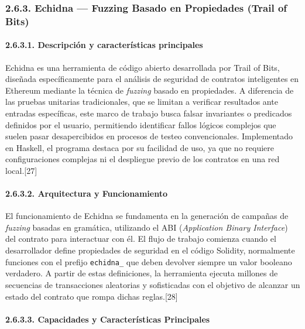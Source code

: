 \subsubsection{2.6.3. Echidna --- Fuzzing Basado en Propiedades (Trail
of Bits)}\label{echidna-fuzzing-basado-en-propiedades-trail-of-bits}

\paragraph{2.6.3.1. Descripción y características
principales}\label{descripciuxf3n-y-caracteruxedsticas-principales-2}

Echidna es una herramienta de código abierto desarrollada por Trail of
Bits, diseñada específicamente para el análisis de seguridad de
contratos inteligentes en Ethereum mediante la técnica de \emph{fuzzing}
basado en propiedades. A diferencia de las pruebas unitarias
tradicionales, que se limitan a verificar resultados ante entradas
específicas, este marco de trabajo busca falsar invariantes o predicados
definidos por el usuario, permitiendo identificar fallos lógicos
complejos que suelen pasar desapercibidos en procesos de testeo
convencionales. Implementado en Haskell, el programa destaca por su
facilidad de uso, ya que no requiere configuraciones complejas ni el
despliegue previo de los contratos en una red local.{[}27{]}

\paragraph{2.6.3.2. Arquitectura y
Funcionamiento}\label{arquitectura-y-funcionamiento-1}

El funcionamiento de Echidna se fundamenta en la generación de campañas
de \emph{fuzzing} basadas en gramática, utilizando el ABI
(\emph{Application Binary Interface}) del contrato para interactuar con
él. El flujo de trabajo comienza cuando el desarrollador define
propiedades de seguridad en el código Solidity, normalmente funciones
con el prefijo \texttt{echidna\_} que deben devolver siempre un valor
booleano verdadero. A partir de estas definiciones, la herramienta
ejecuta millones de secuencias de transacciones aleatorias y
sofisticadas con el objetivo de alcanzar un estado del contrato que
rompa dichas reglas.{[}28{]}

\paragraph{2.6.3.3. Capacidades y Características
Principales}\label{capacidades-y-caracteruxedsticas-principales-2}

